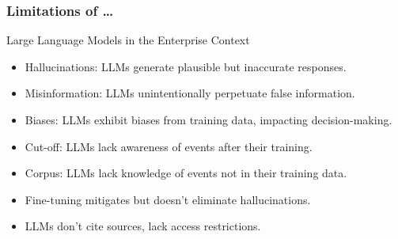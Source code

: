 


\begin{frame}[fragile]\frametitle{Limitations of \ldots}
Large Language Models in the Enterprise Context

\begin{itemize}
\item Hallucinations: LLMs generate plausible but inaccurate responses.
\item Misinformation: LLMs unintentionally perpetuate false information.
\item Biases: LLMs exhibit biases from training data, impacting decision-making.
\item Cut-off: LLMs lack awareness of events after their training.
\item Corpus: LLMs lack knowledge of events not in their training data.
\item Fine-tuning mitigates but doesn't eliminate hallucinations.
\item LLMs don't cite sources, lack access restrictions.
\end{itemize}	

\end{frame}


